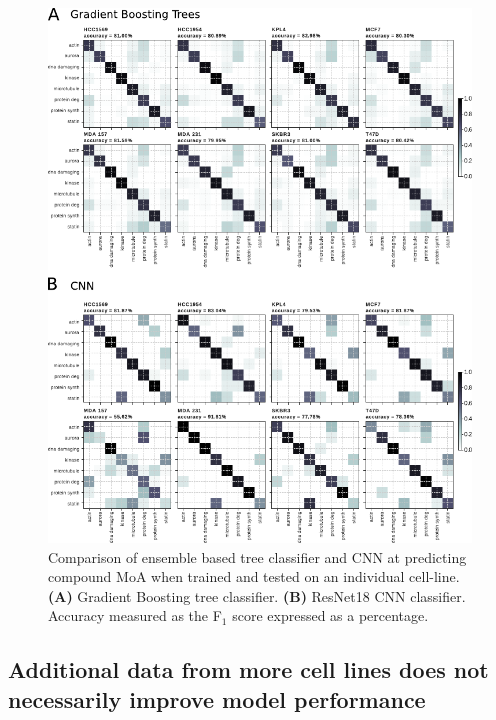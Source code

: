 \documentclass[a4paper,11pt,twoside,openright]{scrbook}
\begin{document}
\begin{figure}
    \includegraphics[width=1.0\textwidth]{ch2SingleCellLine}
    \captionsetup{width=0.8\textwidth}
    \caption[Classifying MoA on a single cell-line]{Comparison of ensemble based tree classifier and CNN at predicting 
compound MoA when trained and tested on an individual cell-line.
    \textbf{(A)} Gradient Boosting tree classifier.
    \textbf{(B)} ResNet18 CNN classifier.
Accuracy measured as the F$_1$ score expressed as a percentage.
    }
    \label{figure:single_cell_line}
\end{figure}




\subsection{Additional data from more cell lines does not necessarily improve model performance}
\end{document}
